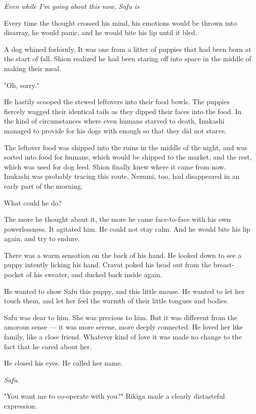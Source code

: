 \emph{Even while I'm going about this now, Safu is\el }

Every time the thought crossed his mind, his emotions would be thrown
into disarray, he would panic, and he would bite his lip until it bled.

A dog whined forlornly. It was one from a litter of puppies that had
been born at the start of fall. Shion realized he had been staring off
into space in the middle of making their meal.

"Oh, sorry."

He hastily scooped the stewed leftovers into their food bowls. The
puppies fiercely wagged their identical tails as they dipped their faces
into the food. In the kind of circumstances where even humans starved to
death, Inukashi managed to provide for his dogs with enough so that they
did not starve.

The leftover food was shipped into the ruins in the middle of the night,
and was sorted into food for humans, which would be shipped to the
market, and the rest, which was used for dog feed. Shion finally knew
where it came from now. Inukashi was probably tracing this route.
Nezumi, too, had disappeared in an early part of the morning.

What could he do?

The more he thought about it, the more he came face-to-face with his own
powerlessness. It agitated him. He could not stay calm. And he would
bite his lip again, and try to endure.

There was a warm sensation on the back of his hand. He looked down to
see a puppy intently licking his hand. Cravat poked his head out from
the breast-pocket of his sweater, and ducked back inside again.

He wanted to show Safu this puppy, and this little mouse. He wanted to
let her touch them, and let her feel the warmth of their little tongues
and bodies.

Safu was dear to him. She was precious to him. But it was different from
the amorous sense --- it was more serene, more deeply connected. He loved
her like family, like a close friend. Whatever kind of love it was made
no change to the fact that he cared about her.

He closed his eyes. He called her name.

\emph{Safu.}

\mybreak

"You want me to co-operate with you?" Rikiga made a clearly distasteful
expression.

